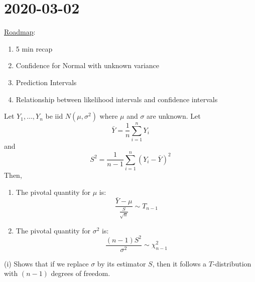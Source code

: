 \section{2020-03-02}
\underline{Roadmap}:
\begin{enumerate}[label=(\roman*)]
    \item 5 min recap
    \item Confidence for Normal with unknown variance
    \item Prediction Intervals
    \item Relationship between likelihood intervals and confidence intervals
\end{enumerate}

\begin{thmbox}
    \begin{theorem}
        Let $ Y_1,\ldots ,Y_n $ be iid $ N(\mu,\sigma^2) $ where $ \mu $ and $ \sigma $ are
        unknown. Let
        \[ \bar{Y}=\frac{1}{n} \sum\limits_{i=1}^{n} Y_i \]
        and
        \[ S^2=\frac{1}{n-1} \sum\limits_{i=1}^{n} (Y_i-\bar{Y})^2 \]
        Then,
        \begin{enumerate}[label=(\roman*)]
            \item The pivotal quantity for $ \mu $ is:
                  \[ \frac{\bar{Y}-\mu}{\frac{S}{\sqrt{n}}} \sim T_{n-1}  \]
            \item The pivotal quantity for $ \sigma^2 $ is:
                  \[ \frac{(n-1)S^2}{\sigma^2} \sim \chi^2_{n-1}  \]
        \end{enumerate}
    \end{theorem}
\end{thmbox}
\begin{remark}
    (i) Shows that if we replace $ \sigma $ by its estimator $ S $, then it follows a $ T $-distribution
    with $ (n-1) $ degrees of freedom.
\end{remark}

